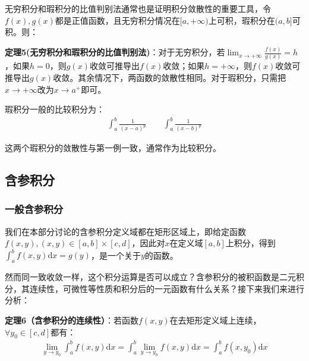 \documentclass{ctexart}
\let\oldtextbf\textbf
\renewcommand{\textbf}[1]{\textcolor{brown!50!red}{\oldtextbf{#1}}}
\begin{document}
无穷积分和瑕积分的比值判别法通常也是证明积分敛散性的重要工具，令$f(x),g(x)$都是正值函数，且无穷积分情况在$[a,+\infty)$上可积，瑕积分在$(a,b]$可积。则：
\begin{tcolorbox}[
    colback=bac2,     %
    colframe=fra2,   %
    coltitle=white,             %
    coltext=tex2,
    title=无穷积分和瑕积分的比值判别法,
    fonttitle=\bfseries,        %
arc=3mm,                     %
breakable
]
\textbf{\color{brown!50!red}定理5(无穷积分和瑕积分的比值判别法)}：对于无穷积分，若$\lim_{x\to+\infty}\frac{f(x)}{g(x)}=h$，如果$h=0$，则$g(x)$收敛可推导出$f(x)$收敛；如果$h=+\infty$，则$f(x)$收敛可推导出$g(x)$收敛。其余情况下，两函数的敛散性相同。对于瑕积分，只需把$x\to+\infty$改为$x\to a^+$即可。
\end{tcolorbox}

瑕积分一般的比较积分为：
\begin{align*}
    \int_a^b\frac{1}{(x-a)^p}\qquad \int_a^b\frac{1}{(x-b)^p}
\end{align*}

这两个瑕积分的敛散性与第一例一致，通常作为比较积分。

\subsection{含参积分}
\subsubsection{一般含参积分}
我们在本部分讨论的含参积分定义域都在矩形区域上，即给定函数$f(x,y),(x,y)\in[a,b]\times[c,d]$，因此对$x$在定义域$[a,b]$上积分，得到$\int_a^b f(x,y)\mathrm{d}x=g(y)$，是一个关于$y$的函数。

然而同一致收敛一样，这个积分运算是否可以成立？含参积分的被积函数是二元积分，其连续性，可微性等性质和积分后的一元函数有什么关系？接下来我们来进行分析：

\begin{tcolorbox}[
    colback=bac2,     %
    colframe=fra2,   %
    coltitle=white,             %
    coltext=tex2,
    title=含参积分的连续性,
    fonttitle=\bfseries,        %
arc=3mm,                     %
breakable
]
\textbf{\color{brown!50!red}定理6（含参积分的连续性）}：若函数$f(x,y)$在去矩形定义域上连续，$\forall y_0\in[c,d]$都有：
\begin{align*}
    \lim_{y\to y_0}\int_a^bf(x,y)\mathrm{d}x=\int_a^b\lim _{y\to y_0}f(x,y)\mathrm{d}x=\int_a^b f(x,y_0)\mathrm{d}x
\end{align*}
\end{tcolorbox}
\end{document}

